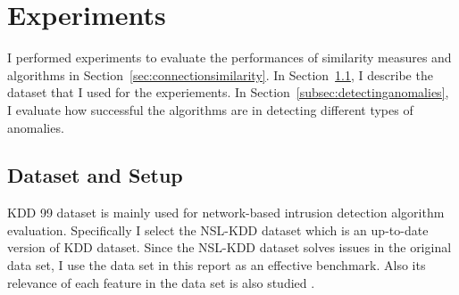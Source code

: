 \section{Experiments}
I performed experiments to evaluate the performances of similarity measures and algorithms in Section~\ref{sec:connectionsimilarity}.
\newline
In Section~\ref{subsec:datasetandsetup}, I describe the dataset that I used for the experiements.\newline
In Section~\ref{subsec:detectinganomalies}, I evaluate how successful the algorithms are in detecting different types of anomalies.

\subsection{Dataset and Setup}
\label{subsec:datasetandsetup}
KDD 99 dataset is mainly used for network-based intrusion detection algorithm evaluation\cite{tavallaee09}. 
Specifically I select the NSL-KDD dataset which is an up-to-date version of KDD dataset. 
Since the NSL-KDD dataset solves issues in the original data set, I use the data set in this report as an effective benchmark. 
Also its relevance of each feature in the data set is also studied\cite{olusola10} \cite{kayacik05}. 

